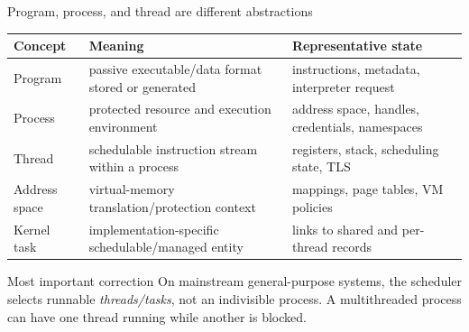 \documentclass[aspectratio=169,11pt]{beamer}
\begin{document}
\begin{frame}{Program, process, and thread are different abstractions}
  \small
  \begin{tabularx}{\textwidth}{@{}lXX@{}}
    \toprule
    \textbf{Concept} & \textbf{Meaning} & \textbf{Representative state} \\
    \midrule
    Program & passive executable/data format stored or generated & instructions, metadata, interpreter request \\
    Process & protected resource and execution environment & address space, handles, credentials, namespaces \\
    Thread & schedulable instruction stream within a process & registers, stack, scheduling state, TLS \\
    Address space & virtual-memory translation/protection context & mappings, page tables, VM policies \\
    Kernel task & implementation-specific schedulable/managed entity & links to shared and per-thread records \\
    \bottomrule
  \end{tabularx}
  \begin{alertblock}{Most important correction}
    On mainstream general-purpose systems, the scheduler selects runnable \emph{threads/tasks}, not an indivisible process. A multithreaded process can have one thread running while another is blocked.
  \end{alertblock}
\end{frame}
\end{document}
